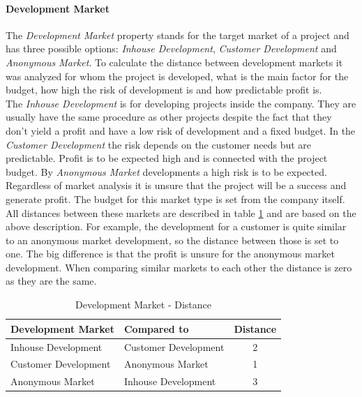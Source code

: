 \paragraph*{\textbf{Development Market}}
The \textit{Development Market} property stands for the target market of a project and has three possible options: \textit{Inhouse Development}, \textit{Customer Development} and \textit{Anonymous Market}. To calculate the distance between development markets it was analyzed for whom the project is developed, what is the main factor for the budget, how high the risk of development is and how predictable profit is.\\ 
The \textit{Inhouse Development} is for developing projects inside the company. They are usually have the same procedure as other projects despite the fact that they don't yield a profit and have a low risk of development and a fixed budget. In the \textit{Customer Development} the risk depends on the customer needs but are predictable. Profit is to be expected high and is connected with the project budget. By \textit{Anonymous Market} developments a high risk is to be expected. Regardless of market analysis it is unsure that the project will be a success and generate profit. The budget for this market type is set from the company itself.\\
All distances between these markets are described in table \ref{property:devmarket} and are based on the above description. For example, the development for a customer is quite similar to an anonymous market development, so the distance between those is set to one. The big difference is that the profit is unsure for the anonymous market development. When comparing similar markets to each other the distance is zero as they are the same.
\begin{table}[h]
	\centering 
	\setlength{\tabcolsep}{4pt}
	\begin{tabular}{|l|l|c|}\hline
		Development Market		& Compared to 			&  Distance 	\\ \hline
		Inhouse Development   	& Customer Development	& 2      		\\ \hline
		Customer Development   	& Anonymous Market 		& 1      		\\ \hline
		Anonymous Market   		& Inhouse Development 	& 3     		\\ \hline
	\end{tabular} 
	\caption{Development Market - Distance} 
	\label{property:devmarket} 
\end{table}
